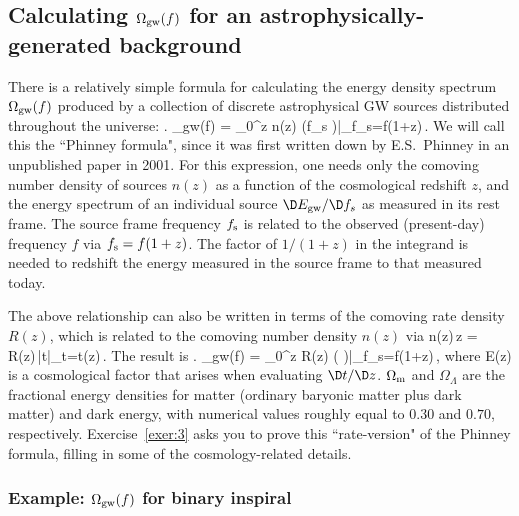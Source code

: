 \subsection{Calculating $\Omega_{\rm gw}(f)$ for an
astrophysically-generated background}
\label{s:Phinney_formula}

There is a relatively simple formula for calculating
the energy density spectrum $\Omega_{\rm gw}(f)$ 
produced by a collection of discrete astrophysical GW 
sources distributed throughout the universe\cite{Phinney:2001}:
%
\be
\left.
\Omega_{\rm gw}(f) = \int_0^\infty \D z\>
n(z) \left(f_{\rm s}
\right)\right|_{f_{\rm s}=f(1+z)}\,.
\label{e:phinney1}
\ee
%
We will call this the ``Phinney formula", since it was 
first written down by E.S.~Phinney in an unpublished
paper in 2001.
For this expression,
one needs only the comoving number density of
sources $n(z)$ as a function of the cosmological redshift $z$, 
and the energy spectrum of an individual source
$\D E_{\rm gw}/\D f_s$ as measured in its rest frame.
The source frame frequency $f_{\rm s}$ is related to the 
observed (present-day) frequency $f$ via $f_{\rm s}=f(1+z)$.
The factor of $1/(1+z)$ in the integrand is needed to 
redshift the energy measured in the source frame to that
measured today.

The above relationship can also be written in terms of 
the comoving rate density $R(z)$, which is related to the
comoving number density $n(z)$ via
%
\be
n(z)\,\D z = R(z)\,|\D t|_{t=t(z)}\,.
\ee
%
The result is
%
\be
\left.
\Omega_{\rm gw}(f) = \int_0^\infty \D z\>
R(z) \left(
\right)\right|_{f_{\rm s}=f(1+z)}\,,
\label{e:phinney2}
\ee
%
where 
%
\be
E(z)\equiv {}
\ee
%
is a cosmological factor that arises when evaluating $\D t/\D z$.
$\Omega_{\rm m}$ and $\Omega_\Lambda$ are the 
fractional energy densities for matter
(ordinary baryonic matter plus dark matter) 
and dark energy, with numerical values roughly
equal to $0.30$ and $0.70$, respectively.
Exercise~\ref{exer:3} asks you to prove this 
``rate-version" of the Phinney formula, filling in some 
of the cosmology-related details.

\subsubsection{Example: $\Omega_{\rm gw}(f)$ for binary inspiral}
\label{s:binary_inspiral}

